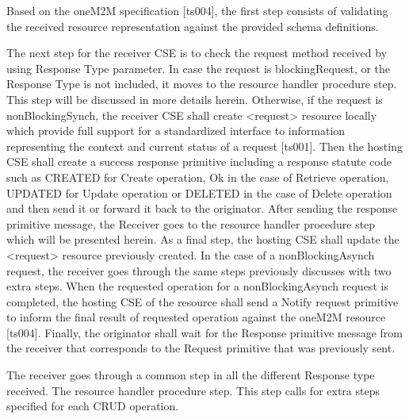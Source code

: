 Based on the oneM2M specification [ts004], the first step consists of validating the received resource representation against the provided schema definitions.\par
The next step for the receiver CSE is to check the request method received by using Response Type parameter. In case the request is blockingRequest, or the Response Type is not included, it moves to the resource handler procedure step. This step will be discussed in more details herein. Otherwise, if the request is nonBlockingSynch, the receiver CSE shall create <request> resource locally which provide full support for a standardized interface to information representing the context and current status of a request [ts001]. Then the hosting CSE shall create a success response primitive including a response statute code such as CREATED for Create operation, Ok in the case of Retrieve operation, UPDATED for Update operation or DELETED in the case of Delete operation and then send it or forward it back to the originator. After sending the response primitive message, the Receiver goes to the resource handler procedure step which will be presented herein. As a final step, the hosting CSE shall update the <request> resource previously created.
In the case of a nonBlockingAsynch request, the receiver goes through the same steps previously discusses with two extra steps. When the requested operation for a nonBlockingAsynch request is completed, the hosting CSE of the resource shall send a Notify request primitive to inform the final result of requested operation against the oneM2M resource [ts004]. Finally, the originator shall wait for the Response primitive message from the receiver that corresponds to the Request primitive that was previously sent.\par
The receiver goes through a common step in all the different Response type received. The resource handler procedure step. This step calls for extra steps specified for each CRUD operation.
